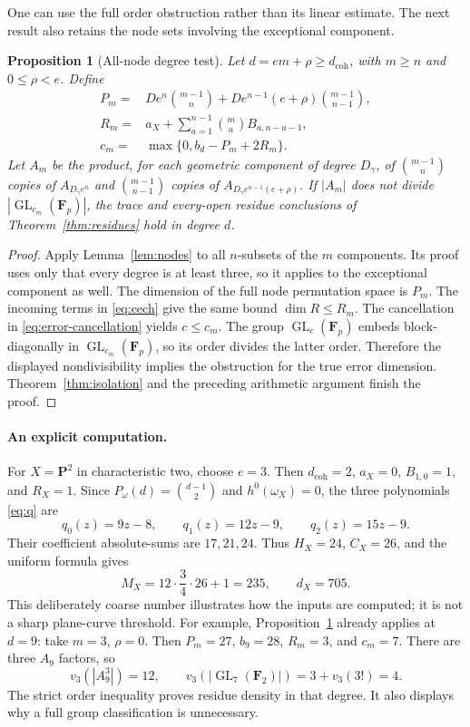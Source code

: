 \documentclass[11pt]{article}
\newtheorem{proposition}[theorem]{Proposition}
\theoremstyle{remark}\newtheorem{remark}[theorem]{Remark}
\newcommand{\FF}{\mathbf F}
\newcommand{\PP}{\mathbf P}
\newcommand{\GL}{\operatorname{GL}}
\begin{document}
One can use the full order obstruction rather than its linear estimate. The next result also retains the node sets involving the exceptional component.

\begin{proposition}[All-node degree test]\label{prop:all-nodes}
Let $d=em+\rho\ge d_{\mathrm{coh}}$, with $m\ge n$ and $0\le\rho<e$. Define
\begin{equation}\label{eq:all-node-data}
 \begin{split}
 P_m={}&De^n\binom{m-1}{n}
       +De^{n-1}(e+\rho)\binom{m-1}{n-1},\\
 R_m={}&a_X+\sum_{a=1}^{n-1}\binom ma B_{a,n-a-1},\\
 c_m={}&\max\{0,b_d-P_m+2R_m\}.
 \end{split}
\end{equation}
Let $A_m$ be the product, for each geometric component of degree $D_\gamma$, of
$\binom{m-1}{n}$ copies of $A_{D_\gamma e^n}$ and
$\binom{m-1}{n-1}$ copies of $A_{D_\gamma e^{n-1}(e+\rho)}$.
If $|A_m|$ does not divide $|\GL_{c_m}(\FF_p)|$, the trace and every-open residue conclusions of Theorem~\ref{thm:residues} hold in degree $d$.
\end{proposition}

\begin{proof}
Apply Lemma~\ref{lem:nodes} to all $n$-subsets of the $m$ components. Its proof uses only that every degree is at least three, so it applies to the exceptional component as well. The dimension of the full node permutation space is $P_m$. The incoming terms in \eqref{eq:cech} give the same bound $\dim R\le R_m$. The cancellation in \eqref{eq:error-cancellation} yields $c\le c_m$. The group $\GL_c(\FF_p)$ embeds block-diagonally in $\GL_{c_m}(\FF_p)$, so its order divides the latter order. Therefore the displayed nondivisibility implies the obstruction for the true error dimension. Theorem~\ref{thm:isolation} and the preceding arithmetic argument finish the proof.
\end{proof}

\paragraph{An explicit computation.}
For $X=\PP^2$ in characteristic two, choose $e=3$. Then
$d_{\mathrm{coh}}=2$, $a_X=0$, $B_{1,0}=1$, and $R_X=1$.
Since $P_\omega(d)=\binom{d-1}{2}$ and $h^0(\omega_X)=0$, the three polynomials \eqref{eq:q} are
\[
               q_0(z)=9z-8,\qquad q_1(z)=12z-9,
                         \qquad q_2(z)=15z-9.
\]
Their coefficient absolute-sums are $17,21,24$. Thus $H_X=24$, $C_X=26$, and the uniform formula gives
\[
                 M_X=12\cdot\frac34\cdot26+1=235,
                          \qquad d_X=705.
\]
This deliberately coarse number illustrates how the inputs are computed; it is not a sharp plane-curve threshold. For example, Proposition~\ref{prop:all-nodes} already applies at $d=9$: take $m=3$, $\rho=0$. Then $P_m=27$, $b_9=28$, $R_m=3$, and $c_m=7$. There are three $A_9$ factors, so
\[
 v_3(|A_9^3|)=12,
       \qquad v_3(|\GL_7(\FF_2)|)=3+v_3(3!)=4.
\]
The strict order inequality proves residue density in that degree. It also displays why a full group classification is unnecessary.
\end{document}
